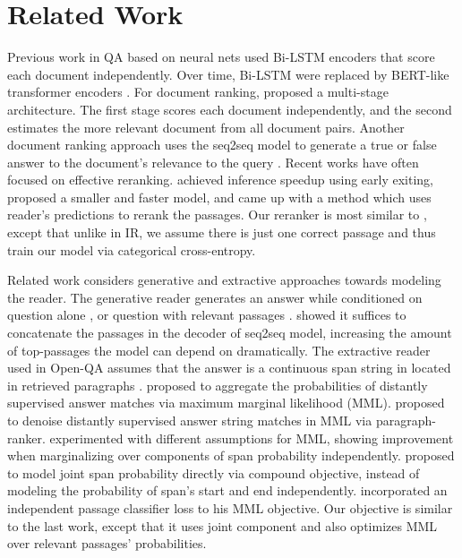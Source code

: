 \documentclass[11pt]{article}
\begin{document}
\section{Related Work}
\begin{description}[style=unboxed,leftmargin=0em,listparindent=\parindent,parsep=0pt,]



\item[Passage reranking.]
Previous work in QA based on neural nets used Bi-LSTM encoders \cite{wang2018r3,lee2018ranking} that score each document independently. Over time, Bi-LSTM were replaced by BERT-like transformer encoders \cite{qiao2019understanding,wang2019multi}. 
 For document ranking, \citet{nogueira2019multistage} proposed a multi-stage architecture. The first stage scores each document independently, and the second estimates the more relevant document from all document pairs. Another document ranking approach uses the seq2seq model to generate a true or false answer to the document's relevance to the query \cite{nogueira2020document}. 
Recent works have often focused on effective reranking. \citet{xin2020early} achieved inference speedup using early exiting, \citet{jang2020document} proposed a smaller and faster model, and \citet{mao2021reader} came up with a method which uses reader's predictions to rerank the passages.
Our reranker is most similar to \citet{nogueira2019passage, luan2020sparse}, except that unlike in IR, we assume there is just one correct passage and thus train our model via categorical cross-entropy.

\item[Multipassage Reading Comprehension] 
Related work considers generative and extractive approaches towards modeling the reader. The generative reader generates an answer while conditioned on question alone \cite{roberts2020much}, or question with relevant passages \cite{lewis2020retrieval,min2020ambigqa}. \citet{izacard2020leveraging} showed it suffices to concatenate the passages in the decoder of seq2seq model, increasing the amount of top-passages the model can depend on dramatically.
The extractive reader used in Open-QA assumes that the answer is a continuous span string in located in retrieved paragraphs  \cite{chen2017reading}. \citet{clark-gardner-2018-simple} proposed to aggregate the probabilities of distantly supervised answer matches via maximum marginal likelihood (MML). \citet{lin2018denoising} proposed to denoise distantly supervised answer string matches in MML via paragraph-ranker. 
\citet{cheng2020probabilistic} experimented with different assumptions for MML, showing improvement when marginalizing over components of span probability independently. \citet{fajcik2020rethinking} proposed to model joint span probability directly via compound objective, instead of modeling the probability of span's start and end independently. \citet{karpukhin2020dense} incorporated an independent passage classifier loss to his MML objective. Our objective is similar to the last work, except that it uses joint component and also optimizes MML over relevant passages' probabilities.


\end{description}
\end{document}
